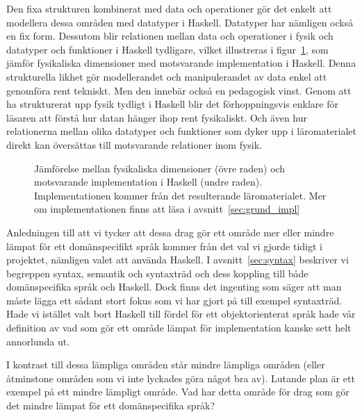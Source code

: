 Den fixa strukturen kombinerat med data och operationer gör det enkelt att
modellera dessa områden med datatyper i Haskell. Datatyper har nämligen också en
fix form. Dessutom blir relationen mellan data och operationer i fysik och
datatyper och funktioner i Haskell tydligare, vilket illustreras i
figur~\ref{fig:haskell_fysik_likhet}, som jämför fysikaliska dimensioner med
motsvarande implementation i Haskell. Denna strukturella likhet gör
modellerandet och manipulerandet av data enkel att genomföra rent tekniskt. Men
den innebär också en pedagogisk vinst. Genom att ha strukturerat upp fysik
tydligt i Haskell blir det förhoppningsvis enklare för läsaren att förstå hur
datan hänger ihop rent fysikaliskt. Och även hur relationerna mellan olika
datatyper och funktioner som dyker upp i läromaterialet direkt kan översättas
till motsvarande relationer inom fysik.

\begin{figure}[tph]
  \centering
  \caption{Jämförelse mellan fysikaliska dimensioner (övre raden) och
  motsvarande implementation i Haskell (undre raden). Implementationen kommer
från det resulterande läromaterialet. Mer om implementationen finns att läsa i
avsnitt~\ref{sec:grund_impl}}\label{fig:haskell_fysik_likhet}
\end{figure}

Anledningen till att vi tycker att dessa drag gör ett område mer eller
mindre lämpat för ett domänspecifikt språk kommer från det val vi gjorde tidigt
i projektet, nämligen valet att använda Haskell. I avsnitt~\ref{sec:syntax}
beskriver vi begreppen syntax, semantik och syntaxträd och dess koppling till
både domänspecifika språk och Haskell. Dock finns det ingenting som säger att
man måste lägga ett sådant stort fokus som vi har gjort på till exempel syntaxträd. Hade
vi istället valt bort Haskell till fördel för ett objektorienterat språk hade vår definition av vad som gör ett område lämpat för
implementation kanske sett helt annorlunda ut.

I kontrast till dessa lämpliga områden står mindre lämpliga områden (eller
åtminstone områden som vi inte lyckades göra något bra av). Lutande plan är ett exempel på ett mindre lämpligt område. Vad har detta område för drag som gör det mindre
lämpat för ett domänspecifika språk?

